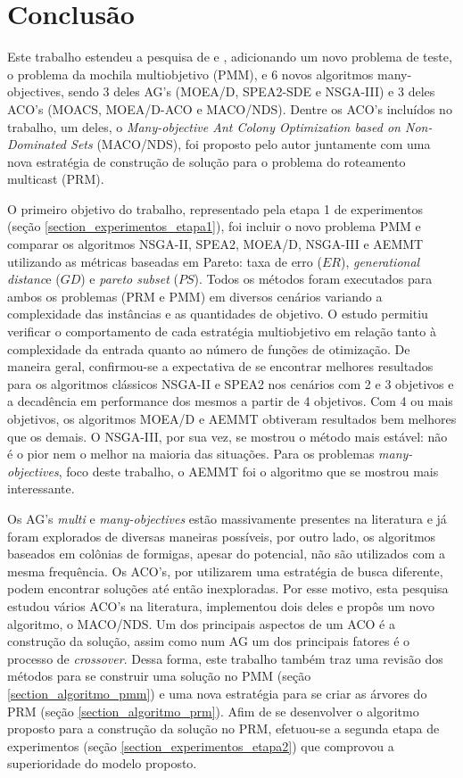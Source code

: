 \chapter[Conclusão]{Conclusão}
Este trabalho estendeu a pesquisa de \cite{Bueno2010} e \cite{Lafeta2016}, adicionando um novo problema de teste, o problema da mochila multiobjetivo (PMM), e 6 novos algoritmos many-objectives, sendo 3 deles AG's (MOEA/D, SPEA2-SDE e NSGA-III) e 3 deles ACO's (MOACS, MOEA/D-ACO e MACO/NDS). Dentre os ACO's incluídos no trabalho, um deles, o \textit{Many-objective Ant Colony Optimization based on Non-Dominated Sets} (MACO/NDS), foi proposto pelo autor juntamente com uma nova estratégia de construção de solução para o problema do roteamento multicast (PRM).

O primeiro objetivo do trabalho, representado pela etapa 1 de experimentos (seção \ref{section_experimentos_etapa1}), foi incluir o novo problema PMM e comparar os algoritmos NSGA-II, SPEA2, MOEA/D, NSGA-III e AEMMT utilizando as métricas baseadas em Pareto: taxa de erro ($ER$), \textit{generational distanc}e ($GD$) e \textit{pareto subset} ($PS$). Todos os métodos foram executados para ambos os problemas (PRM e PMM) em diversos cenários variando a complexidade das instâncias e as quantidades de objetivo. O estudo permitiu verificar o comportamento de cada estratégia multiobjetivo em relação tanto à complexidade da entrada quanto ao número de funções de otimização. De maneira geral, confirmou-se a expectativa de se encontrar melhores resultados para os algoritmos clássicos NSGA-II e SPEA2 nos cenários com 2 e 3 objetivos e a decadência em performance dos mesmos a partir de 4 objetivos. Com 4 ou mais objetivos, os algoritmos MOEA/D e AEMMT obtiveram resultados bem melhores que os demais. O NSGA-III, por sua vez, se mostrou o método mais estável: não é o pior nem o melhor na maioria das situações. Para os problemas \textit{many-objectives}, foco deste trabalho, o AEMMT foi o algoritmo que se mostrou mais interessante.

Os AG's \textit{multi} e \textit{many-objectives} estão massivamente presentes na literatura e já foram explorados de diversas maneiras possíveis, por outro lado, os algoritmos baseados em colônias de formigas, apesar do potencial, não são utilizados com a mesma frequência. Os ACO's, por utilizarem uma estratégia de busca diferente, podem encontrar soluções até então inexploradas. Por esse motivo, esta pesquisa estudou vários ACO's na literatura, implementou dois deles e propôs um novo algoritmo, o MACO/NDS. Um dos principais aspectos de um ACO é a construção da solução, assim como num AG um dos principais fatores é o processo de \textit{crossover}. Dessa forma, este trabalho também traz uma revisão dos métodos para se construir uma solução no PMM (seção \ref{section_algoritmo_pmm}) e uma nova estratégia para se criar as árvores do PRM (seção \ref{section_algoritmo_prm}). Afim de se desenvolver o algoritmo proposto para a construção da solução no PRM, efetuou-se a segunda etapa de experimentos (seção \ref{section_experimentos_etapa2}) que comprovou a superioridade do modelo proposto.

